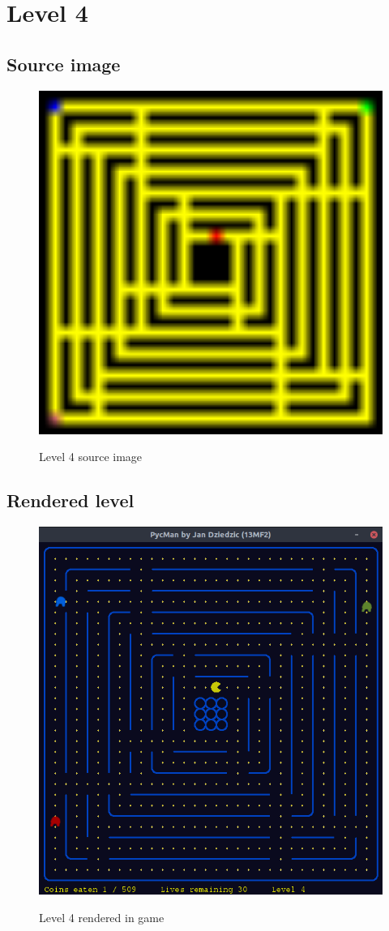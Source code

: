 \documentclass[11pt,a4paper,notitlepage]{report}
\newcommand{\dsubsection}[1]{\FloatBarrier \subsection{#1}}
\newenvironment{img}{
	\begin{center}
		\begin{figure}[H]
			\begin{center}
			
}{
	\end{center}
		\end{figure}
			\end{center}
}
\begin{document}
		\section{Level 4}
			\dsubsection{Source image}
			\begin{img}
				\includegraphics[width=350pt]{images/level4}\\
				\caption{Level 4 source image}
			\end{img}
			\dsubsection{Rendered level}
			\begin{img}
				\includegraphics[width=350pt]{images/level4_r}\\
				\caption{Level 4 rendered in game}
			\end{img}
\end{document}
